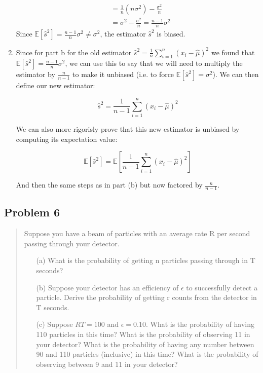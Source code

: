 \documentclass[10pt]{article}
\begin{document}
\begin{enumerate}[label=(\alph*)]
\begin{align*}
		                            & = \frac{1}{n}(n\sigma^2) - \frac{\sigma^2}{n}                                                                                                                            \\
		                            & = \sigma^2 - \frac{\sigma^2}{n} = \frac{n-1}{n}\sigma^2
	      \end{align*}
	      Since $\mathbb{E}[\hat{s}^2] = \frac{n-1}{n}\sigma^2 \neq \sigma^2$, the estimator $\hat{s}^2$ is biased.

	\item Since for part b for the old estimator $\hat{s}^2 = \frac{1}{n} \sum_{i=1}^{n} (x_i - \hat{\mu})^2$ we found that $\mathbb{E}[\hat{s}^2] = \frac{n-1}{n}\sigma^2$, we can use this to say that we will need to multiply the estimator by $\frac{n}{n-1}$ to make it unbiased (i.e. to force $\mathbb{E}[\hat{s}^2] = \sigma^2$). We can then define our new estimator:

	      \[ \boxed{\hat{s}^2= \frac{1}{n-1} \sum_{i=1}^{n} (x_i - \hat{\mu})^2 }\]

	      We can also more rigorisly prove that this new estimator is unbiased by computing its expectation value:

	      \[ \mathbb{E}[\hat{s}^2] = \mathbb{E}\left[\frac{1}{n-1} \sum_{i=1}^{n} (x_i - \hat{\mu})^2\right] \]

	      And then the same steps as in part (b) but now factored by $\frac{n}{n-1}$.
\end{enumerate}


\subsection*{Problem 6}
\begin{quote}
	Suppose you have a beam of particles with an average rate R per second passing through your detector.
	\begin{enumerate}
		\item[(a)] What is the probability of getting n particles passing through in T seconds?
		\item[(b)] Suppose your detector has an efficiency of $\epsilon$ to successfully detect a particle. Derive the probability of getting r counts from the detector in T seconds.
		\item[(c)] Suppose $RT=100$ and $\epsilon=0.10$. What is the probability of having 110 particles in this time? What is the probability of observing 11 in your detector? What is the probability of having any number between 90 and 110 particles (inclusive) in this time? What is the probability of observing between 9 and 11 in your detector?
	\end{enumerate}
\end{quote}
\end{document}
